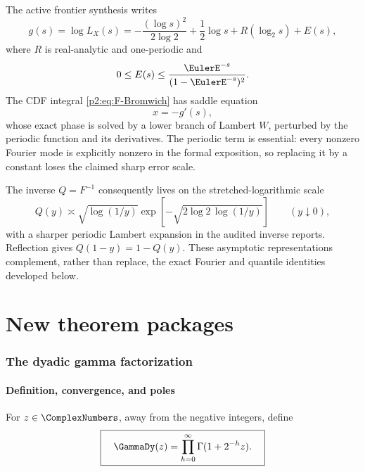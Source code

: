 \documentclass[11pt]{article}
\theoremstyle{definition}
\theoremstyle{remark}
\begin{document}
The active frontier synthesis writes
\begin{equation}
 g(s)=\log L_X(s)
 =-\frac{(\log s)^2}{2\log2}+\frac12\log s
   +R(\log_2s)+E(s),                                     \label{p2:eq:g-decomp}
\end{equation}
where $R$ is real-analytic and one-periodic and
\begin{equation}
 0\le E(s)\le\frac{\EulerE^{-s}}{(1-\EulerE^{-s})^2}.              \label{p2:eq:E-bound}
\end{equation}
The CDF integral \eqref{p2:eq:F-Bromwich} has saddle equation
\begin{equation}
 x=-g'(s),                                                \label{p2:eq:saddle-eq}
\end{equation}
whose exact phase is solved by a lower branch of Lambert $W$, perturbed by the periodic
function and its derivatives.  The periodic term is essential: every nonzero Fourier mode is
explicitly nonzero in the formal exposition, so replacing it by a constant loses the claimed
sharp error scale.

The inverse $Q=F^{-1}$ consequently lives on the stretched-logarithmic scale
\begin{equation}
 Q(y)\asymp
 \sqrt{\log(1/y)}
 \exp\left[-\sqrt{2\log2\,\log(1/y)}\right]
 \qquad(y\downarrow0),                                  \label{p2:eq:Q-scale}
\end{equation}
with a sharper periodic Lambert expansion in the audited inverse reports.  Reflection gives
$Q(1-y)=1-Q(y)$.  These asymptotic representations complement, rather than replace, the exact
Fourier and quantile identities developed below.

\clearpage
\part*{New theorem packages}

\section{The dyadic gamma factorization}
\label{p2:sec:dyadic-gamma}

\subsection{Definition, convergence, and poles}

\begin{definition}
For $z\in\ComplexNumbers$, away from the negative integers, define
\begin{equation}
 \boxed{\quad
 \GammaDy(z)=\prod_{h=0}^{\infty}\Gamma(1+2^{-h}z).
 \quad}                                                  \label{p2:eq:GammaDy-def}
\end{equation}
\end{definition}
\end{document}
